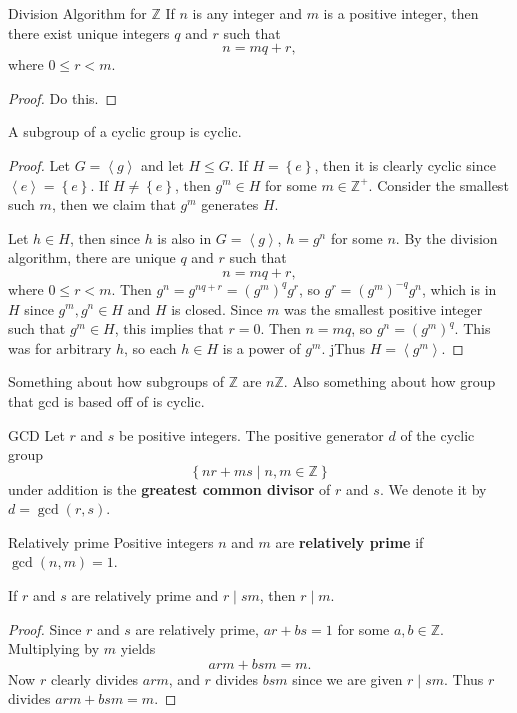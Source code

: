 \documentclass[10pt]{report}
\begin{document}
\begin{thrm}{Division Algorithm for $\mathbb{Z}$}{}
If $n$ is any integer and $m$ is a positive integer, then there exist unique integers $q$ and $r$ such that
\[
n = mq + r,
\] where $0 \leq r < m.$
\end{thrm}
\begin{proof}
	{\color{red}Do this.}
\end{proof}

\begin{prop}
	A subgroup of a cyclic group is cyclic.
\end{prop}
\begin{proof}
	Let $G = \left\langle g \right\rangle$ and let $H \leq G$. If $H = \left\{ e \right\}$, then it is clearly cyclic since $\left\langle e \right\rangle = \left\{ e \right\}$. If $H \neq \left\{ e \right\}$, then $g^{m}\in H$ for some $m \in \mathbb{Z}^+$. Consider the smallest such $m$, then we claim that $g^m$ generates $H$.

	Let $h \in H$, then since $h$ is also in $G = \left\langle g \right\rangle$, $h = g^n$ for some $n$. By the division algorithm, there are unique $q$ and $r$ such that
	\[
	n = mq+r,
\] where $0 \leq r < m$. Then $g^n = g^{nq+r}= (g^m)^q g^r$, so $g^r = (g^m)^{-q}g^n$, which is in $H$ since $g^m, g^n \in H$ and $H$ is closed. Since $m$ was the smallest positive integer such that $g^m \in H$, this implies that $r=0$. Then $n=mq$, so $g^n = (g^m)^q$. This was for arbitrary $h$, so each $h \in H$ is a power of $g^m$. jThus $H = \left\langle g^m \right\rangle$.
\end{proof}

{\color{red}Something about how subgroups of $\mathbb{Z}$ are $n\mathbb{Z}$. Also something about how group that gcd is based off of is cyclic.}

\begin{defn}{GCD}{}
Let $r$ and $s$ be positive integers. The positive generator $d$ of the cyclic group
\[
\left\{ nr+ms \;|\; n,m \in \mathbb{Z} \right\}
\] under addition is the \textbf{greatest common divisor} of $r$ and $s$. We denote it by $d = \gcd(r,s)$.
\end{defn}

\begin{defn}{Relatively prime}{}
	Positive integers $n$ and $m$ are \textbf{relatively prime} if $\gcd(n,m)=1$.
\end{defn}

\begin{prop}
	If $r$ and $s$ are relatively prime and $r \;|\; sm$, then $r \;|\; m$.
\end{prop}
\begin{proof}
	Since $r$ and $s$ are relatively prime, $ar+bs=1$ for some $a,b \in \mathbb{Z}$. Multiplying by $m$ yields
	\[
	arm + bsm = m.
	\] Now $r$ clearly divides $arm$, and $r$ divides $bsm$ since we are given $r \;|\; sm$. Thus $r$ divides $arm+bsm=m$.
\end{proof}
\end{document}
